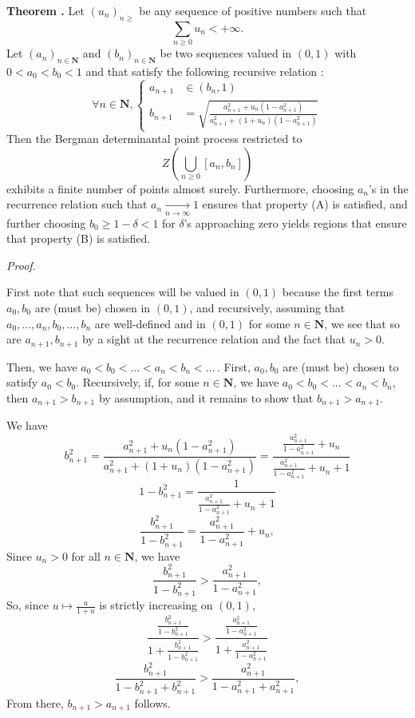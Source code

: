 \documentclass[11pt]{article}
\newcounter{cnt}
\newcommand{\cnt}{\thecnt \stepcounter{cnt}}
\begin{document}
\textbf{Theorem \cnt.} Let $ (u_n)_{n\geqslant} $ be any sequence of positive numbers such that 
\[ 
    \sum_{n \ge 0} u_n < + \infty. 
\] 
Let $ (a_n)_{n \in \mathbf N} $ and $ (b_n)_{n \in \mathbf N} $ be two sequences valued in $ (0,1) $ with $ 0 < a_0 < b_0 < 1 $ and that satisfy the following recursive relation :
\[
\forall n \in \mathbf N, 
\left\{
\begin{aligned}
    a_{n+1} &\in (b_n, 1) \\
    b_{n+1} &= \sqrt{ \frac{a_{n+1}^2 + u_n(1-a_{n+1}^2)}{a_{n+1}^2 + (1+u_n)(1-a_{n+1}^2)} }
\end{aligned}
\right.
\]
Then the Bergman determinantal point process restricted to 
\[
    Z\left( \bigcup_{n \ge 0} [a_n, b_n]\right) 
\]
exhibits a finite number of points almost surely. Furthermore, choosing $ a_n $'s in the recurrence relation such that $ a_n \xrightarrow[n \to \infty ]{} 1 $ ensures that property (A) is satisfied, and further choosing $ b_0 \geqslant 1 - \delta < 1$ for $ \delta $'s approaching zero yields regions that ensure that property (B) is satisfied. 

\textit{Proof.}

First note that such sequences will be valued in $(0,1)$ because the first terms $ a_0, b_0$ are (must be) chosen in $ (0,1) $, and recursively, assuming that $ a_0, ..., a_n, b_0, ..., b_n $ are well-defined and in $(0,1)$ for some $ n \in \mathbf N$, we see that so are $ a_{n+1}, b_{n+1} $ by a sight at the recurrence relation and the fact that $ u_n > 0 $. 

Then, we have $ a_0 < b_0 < ... < a_n < b_n < ... \,$. First, $ a_0, b_0 $ are (must be) chosen to satisfy $ a_0 < b_0 $. Recursively, if, for some $ n \in \mathbf N $, we have $ a_0 < b_0 < ... < a_n < b_n $, then $ a_{n+1} > b_{n+1} $ by assumption, and it remains to show that $ b_{n+1} > a_{n+1} $.

We have
\[
    b_{n+1}^2 = \frac{a_{n+1}^2 + u_n(1-a_{n+1}^2)}{a_{n+1}^2 + (1+u_n)(1-a_{n+1}^2) } = \frac{\displaystyle \frac{a_{n+1}^2}{1-a_{n+1}^2} + u_n}{\displaystyle \frac{a_{n+1}^2}{1-a_{n+1}^2} + u_n + 1} 
\]
\[
    1 - b_{n+1}^2 = \frac{1}{\frac{a_{n+1}^2}{\displaystyle 1-a_{n+1}^2} + u_n + 1}
\]
\[ 
    \frac{b_{n+1}^2}{1 - b_{n+1}^2} = \frac{a_{n+1}^2}{1-a_{n+1}^2} + u_n,
\]
Since $ u_n > 0 $ for all $ n \in \mathbf N $, we have
\[
    \frac{b_{n+1}^2}{1 - b_{n+1}^2} > \frac{a_{n+1}^2}{1-a_{n+1}^2},
\]
So, since $ u \mapsto \frac{u}{1+u} $ is strictly increasing on $ (0,1) $, 
\[
    \frac{\displaystyle \frac{b_{n+1}^2}{1 - b_{n+1}^2}}{\displaystyle 1+\frac{b_{n+1}^2}{1 - b_{n+1}^2}} > \frac{\displaystyle \frac{a_{n+1}^2}{1-a_{n+1}^2}}{\displaystyle 1+\frac{a_{n+1}^2}{1-a_{n+1}^2}}
\]
\[
    \frac{b_{n+1}^2}{1-b_{n+1}^2+b_{n+1}^2} > \frac{a_{n+1}^2}{1-a_{n+1}^2+a_{n+1}^2},
\]
From there, $ b_{n+1} > a_{n+1} $ follows.
\end{document}
